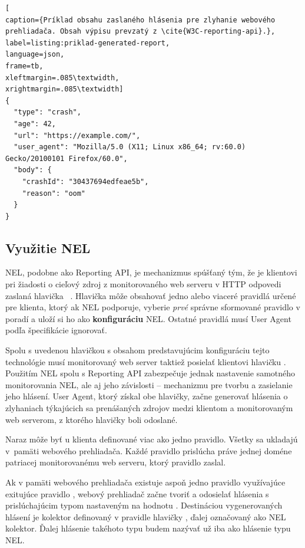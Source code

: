 \begin{center}
\centering
\begin{lstlisting}[
caption={Príklad obsahu zaslaného hlásenia pre zlyhanie webového prehliadača. Obsah výpisu prevzatý z \cite{W3C-reporting-api}.},
label=listing:priklad-generated-report, 
language=json, 
frame=tb,
xleftmargin=.085\textwidth, 
xrightmargin=.085\textwidth]
{
  "type": "crash",
  "age": 42,
  "url": "https://example.com/",
  "user_agent": "Mozilla/5.0 (X11; Linux x86_64; rv:60.0) Gecko/20100101 Firefox/60.0",
  "body": {
    "crashId": "30437694edfeae5b",
    "reason": "oom"
  }
}
\end{lstlisting}
\end{center}



\subsection{Využitie NEL}
\label{network-error-logging-spec}

NEL, podobne ako Reporting API, je mechanizmus spúšťaný tým, že je klientovi pri žiadosti o cieľový zdroj z monitorovaného web serveru v HTTP odpovedi zaslaná hlavička \mbox{ \cite{W3C-NEL}}.
Hlavička  môže obsahovať jedno alebo viaceré pravidlá určené pre klienta, ktorý ak NEL podporuje, vyberie \textit{prvé} správne sformované pravidlo v poradí a uloží si ho ako \textbf{konfiguráciu} NEL.
Ostatné pravidlá musí User Agent podľa špecifikácie ignorovať.

Spolu s uvedenou hlavičkou s obsahom predstavujúcim konfiguráciu tejto technológie musí monitorovaný web server taktiež posielať klientovi hlavičku . 
Použitím NEL spolu s Reporting API zabezpečuje jednak nastavenie samotného monitorovania NEL, ale aj jeho závislosti -- mechanizmu pre tvorbu a zasielanie jeho hlásení.
User Agent, ktorý získal obe hlavičky, začne generovať hlásenia o zlyhaniach týkajúcich sa prenášaných zdrojov medzi klientom a monitorovaným web serverom, z ktorého hlavičky boli odoslané. 

Naraz môže byť u klienta definované viac ako jedno pravidlo.
Všetky sa ukladajú \mbox{v pamäti} webového prehliadača.
Každé pravidlo prislúcha práve jednej doméne patriacej monitorovanému web serveru, ktorý pravidlo zaslal. 

Ak v pamäti webového prehliadača existuje aspoň jedno pravidlo  využívajúce exitujúce pravidlo , 
webový prehliadač začne tvoriť a odosielať hlásenia s prislúchajúcim typom nastaveným na hodnotu . 
Destináciou vygenerovaných hlásení je kolektor definovaný v pravidle hlavičky , ďalej označovaný ako NEL kolektor. 
Ďalej hlásenie takéhoto typu budem nazývať už iba ako hlásenie typu NEL.

